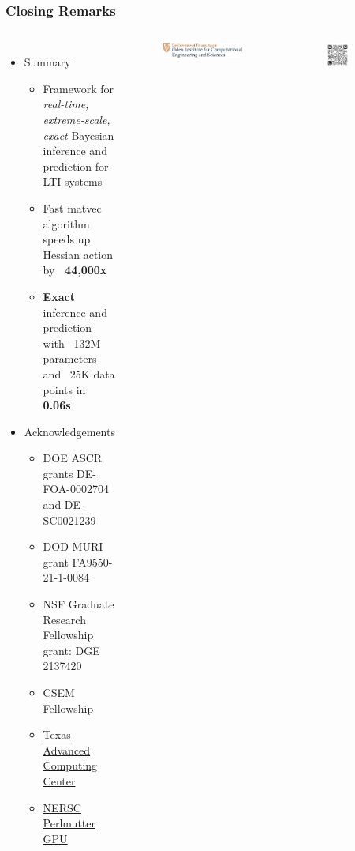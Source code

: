 \begin{frame}
    \frametitle{Closing Remarks}
    \begin{columns}
        \begin{itemize}
            \item Summary
            \begin{itemize}
                \item Framework for \emph{real-time, extreme-scale, exact} Bayesian inference and prediction for LTI systems
                \item Fast matvec algorithm speeds up Hessian action by \textbf{~44,000x}
                \item \textbf{Exact} inference and prediction with ~132M parameters and ~25K data points in \textbf{0.06s}
            \end{itemize}
            \item Acknowledgements
            \begin{itemize}
                \item DOE ASCR grants DE-FOA-0002704 and DE-SC0021239
                \item DOD MURI grant FA9550-21-1-0084
                \item NSF Graduate Research Fellowship grant: DGE 2137420
                \item CSEM Fellowship
                \item \href{https://tacc.utexas.edu/}{Texas Advanced Computing Center}
                \item \href{https://www.nersc.gov/}{NERSC Perlmutter GPU}
            \end{itemize}
        \end{itemize}
        \begin{figure}
            \centering
            \includegraphics[width=0.95\textwidth]{siam_pp_24/Oden-logo-cropped.svg}
        \end{figure}
        \begin{figure}
            \centering
            \includegraphics[width=0.5\textwidth]{JMM/images/misc/qr_jmm.svg}

\end{figure}
\end{columns}
\end{frame}
